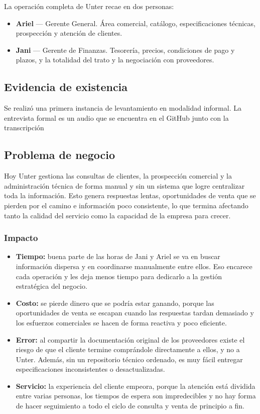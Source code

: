 \documentclass{article}
\begin{document}
\noindent La operación completa de Unter recae en dos personas:

\begin{itemize}
\item \textbf{Ariel} --- Gerente General. Área comercial, catálogo, especificaciones técnicas, prospección y atención de clientes.
\item \textbf{Jani} --- Gerente de Finanzas. Tesorería, precios, condiciones de pago y plazos, y la totalidad del trato y la negociación con proveedores.
\end{itemize}

\subsection{Evidencia de existencia}

Se realizó una primera instancia de levantamiento en modalidad informal. La entrevista formal es un audio que se encuentra en el GitHub junto con la transcripción

\subsection{Problema de negocio}

Hoy Unter gestiona las consultas de clientes, la prospección comercial y la administración técnica de forma manual y sin un sistema que logre centralizar toda la información. Esto genera respuestas lentas, oportunidades de venta que se pierden por el camino e información poco consistente, lo que termina afectando tanto la calidad del servicio como la capacidad de la empresa para crecer.

\subsubsection*{Impacto}

\begin{itemize}
\item \textbf{Tiempo:} buena parte de las horas de Jani y Ariel se va en buscar información dispersa y en coordinarse manualmente entre ellos. Eso encarece cada operación y les deja menos tiempo para dedicarlo a la gestión estratégica del negocio.
\item \textbf{Costo:} se pierde dinero que se podría estar ganando, porque las oportunidades de venta se escapan cuando las respuestas tardan demasiado y los esfuerzos comerciales se hacen de forma reactiva y poco eficiente.
\item \textbf{Error:} al compartir la documentación original de los proveedores existe el riesgo de que el cliente termine comprándole directamente a ellos, y no a Unter. Además, sin un repositorio técnico ordenado, es muy fácil entregar especificaciones inconsistentes o desactualizadas.
\item \textbf{Servicio:} la experiencia del cliente empeora, porque la atención está dividida entre varias personas, los tiempos de espera son impredecibles y no hay forma de hacer seguimiento a todo el ciclo de consulta y venta de principio a fin.
\end{itemize}
\end{document}
